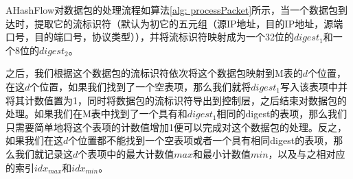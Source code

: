 \documentclass{article}
\begin{document}
\begin{algorithm}[ht!]
	\caption{$processPacket(p)$}
	\label{alg: processPacket}
	\algrenewcommand{}
	\begin{algorithmic}[1]
		\Return
		\Return
		\Else
		\EndIf
		\EndIf
		\EndIf
		\EndFor
		\Else
		\EndIf
		\Else
		\Else
		\EndIf
		\EndIf
	\end{algorithmic}
\end{algorithm}



AHashFlow对数据包的处理流程如算法\ref{alg: processPacket}所示，当一个数据包到达时，提取它的流标识符（默认为初它的五元组（源IP地址，目的IP地址，源端口号，目的端口号，协议类型）），并将流标识符映射成为一个32位的$digest_1$和一个8位的$digest_2$。

之后，我们根据这个数据包的流标识符依次将这个数据包映射到M表的$d$个位置，在这$d$个位置，如果我们找到了一个空表项，那么我们就将$digest_1$写入该表项中并将其计数值置为1，同时将数据包的流标识符导出到控制层，之后结束对数据包的处理。如果我们在M表中找到了一个具有和$digest_1$相同的digest的表项，那么我们只需要简单地将这个表项的计数值增加1便可以完成对这个数据包的处理。反之，如果我们在这$d$个位置都不能找到一个空表项或者一个具有相同digest的表项，那么我们就记录这$d$个表项中的最大计数值$max$和最小计数值$min$，以及与之相对应的索引$idx_{max}$和$idx_{min}$。
\end{document}
